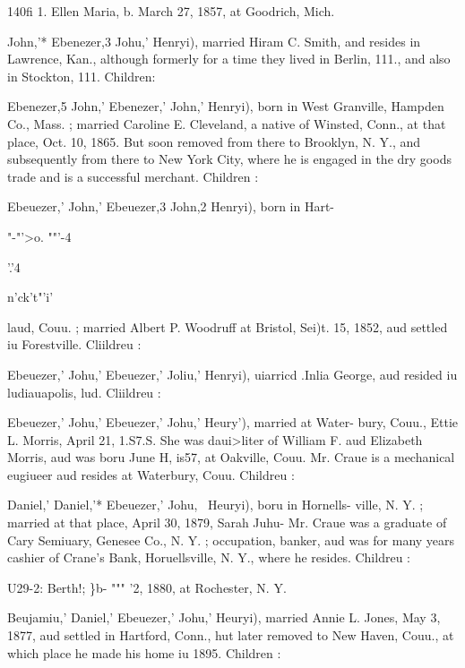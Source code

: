 \documentclass{book}
\begin{document}
140fi 1. Ellen Maria, b. March 27, 1857, at Goodrich, Mich. 



John,'* Ebenezer,3 Johu,' Henryi), married Hiram C. Smith, and 
resides in Lawrence, Kan., although formerly for a time they lived 
in Berlin, 111., and also in Stockton, 111. Children: 



Ebenezer,5 John,' Ebenezer,' John,' Henryi), born in West 
Granville, Hampden Co., Mass. ; married Caroline E. Cleveland, 
a native of Winsted, Conn., at that place, Oct. 10, 1865. But 
soon removed from there to Brooklyn, N. Y., and subsequently 
from there to New York City, where he is engaged in the dry 
goods trade and is a successful merchant. Children : 



Ebeuezer,' John,' Ebeuezer,3 John,2 Henryi), born in Hart- 







"-"'>o. ""'-4 



'.'4 



n'ck't"'i' 




laud, Couu. ; married Albert P. Woodruff at Bristol, Sei)t. 15, 
1852, aud settled iu Forestville. Cliildreu : 



Ebeuezer,' Johu,' Ebeuezer,' Joliu,' Henryi), uiarricd .Inlia 
George, aud resided iu ludiauapolis, lud. Cliildreu : 


Ebeuezer,' Johu,' Ebeuezer,' Johu,' Heury'), married at Water- 
bury, Couu., Ettie L. Morris, April 21, 1.S7.S. She was daui>liter 
of William F. aud Elizabeth Morris, aud was boru June H, is57, 
at Oakville, Couu. Mr. Craue is a mechanical eugiueer aud 
resides at Waterbury, Couu. Childreu : 


Daniel,' Daniel,'* Ebeuezer,' Johu,~ Heuryi), boru in Hornells- 
ville, N. Y. ; married at that place, April 30, 1879, Sarah Juhu- 
Mr. Craue was a graduate of Cary Semiuary, Genesee Co., N. 
Y. ; occupation, banker, aud was for many years cashier of 
Crane's Bank, Horuellsville, N. Y., where he resides. Childreu : 

U29-2: Berth!; \}b- """ '2, 1880, at Rochester, N. Y. 

Beujamiu,' Daniel,' Ebeuezer,' Johu,' Heuryi), married Annie 
L. Jones, May 3, 1877, aud settled in Hartford, Conn., hut later 
removed to New Haven, Couu., at which place he made his home 
iu 1895. Children : 
\end{document}
